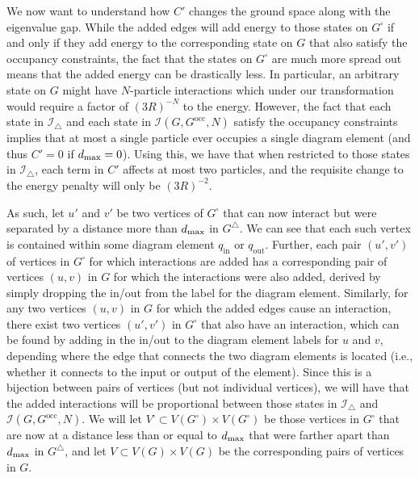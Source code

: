 \documentclass[../thesis-main/thesis-main]{subfiles}
\begin{document}
We now want to understand how $C'$ changes the ground space along with the eigenvalue gap.  While the added edges will add energy to those states on $G^\square$ if and only if they add energy to the corresponding state on $G$ that also satisfy the occupancy constraints, the fact that the states on $G^\square$ are much more spread out means that the added energy can be drastically less.  In particular, an arbitrary state on $G$ might have $N$-particle interactions which under our transformation would require a factor of $(3R)^{-N}$ to the energy.  However, the fact that each state in $\mathcal{I}_{\triangle}$ and each state in $\mathcal{I}(G,G^{\text{occ}},N)$ satisfy the occupancy constraints implies that at most a single particle ever occupies a single diagram element (and thus $C'=0$ if $d_{\text{max}} = 0$).  Using this, we have that when restricted to those states in $\mathcal{I}_{\triangle}$, each term in $C'$ affects at most two particles, and  the requisite change to the energy penalty will only be $(3R)^{-2}$.

As such, let $u'$ and $v'$ be two vertices of $G^\square$ that can now interact but were separated by a distance more than $d_{\text{max}}$ in $G^\triangle$.  We can see that each such vertex is contained within some diagram element $q_{\text{in}}$ or $q_{\text{out}}$.  Further, each pair $(u',v')$ of vertices in $G^\square$ for which interactions are added has a corresponding pair of vertices $(u,v)$ in $G$ for which the interactions were also added, derived by simply dropping the in/out from the label for the diagram element.  Similarly, for any two vertices $(u,v)$ in $G$ for which the added edges cause an interaction, there exist two vertices $(u',v')$ in $G^\square$ that also have an interaction, which can be found by adding in the in/out to the diagram element labels for $u$ and $v$, depending where the edge that connects the two diagram elements is located (i.e., whether it connects to the input or output of the element).  Since this is a bijection between pairs of vertices (but not individual vertices), we will have that the added interactions will be proportional between those states in $\mathcal{I}_{\triangle}$ and $\mathcal{I}(G,G^{\text{occ}},N)$.  We will let $V^\square \subset V(G^\square) \times V(G^\square)$ be those vertices in $G^\square$ that are now at a distance less than or equal to $d_{\text{max}}$ that were farther apart than $d_{\text{max}}$ in $G^\triangle$, and let $V\subset V(G)\times V(G)$ be the corresponding pairs of vertices in $G$.
\end{document}
